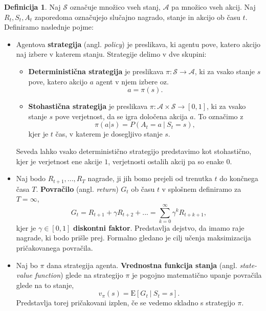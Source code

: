 \documentclass[12pt,a4paper]{amsart}
\theoremstyle{definition} %
\newtheorem{definicija}{Definicija}[section]
\theoremstyle{plain} %
\begin{document}
\begin{definicija}
    Naj $\mathcal{S}$ označuje množico vseh stanj, $\mathcal{A}$ pa množico vseh akcij. Naj $R_t,
    S_t, A_t$ zaporedoma označujejo slučajno nagrado, stanje in akcijo ob času $t$. Definiramo naslednje 
    pojme: 
    \begin{itemize}
        \item   Agentova \textbf{strategija} (angl. \textit{policy}) je preslikava, ki agentu pove, 
                katero akcijo naj izbere v katerem stanju. Strategije delimo v dve skupini:
                \begin{itemize}
                    \item \textbf{Deterministična strategija} je preslikava $\pi: \mathcal{S} 
                    \rightarrow \mathcal{A}$, ki za vsako stanje $s$ pove, katero akcijo $a$ agent v njem 
                    izbere oz.
                    $$
                    a = \pi(s).
                    $$
                    \item \textbf{Stohastična strategija} je preslikava $\pi: \mathcal{A} \times 
                    \mathcal{S} \rightarrow [0, 1]$, ki za vsako stanje $s$ pove verjetnost, da se igra 
                    določena akcija $a$. To označimo z
                    $$
                    \pi(a | s) = P(A_t = a~|~S_t = s),
                    $$
                    kjer je $t$ čas, v katerem je dosegljivo stanje $s$.
                \end{itemize}
                Seveda lahko vsako deterministično strategijo predstavimo kot stohastično, kjer je 
                verjetnost ene akcije $1$, verjetnosti ostalih akcij pa so enake $0$.
        
        \item Naj bodo $R_{t+1}, ...,R_T$ nagrade, ji jih bomo prejeli od trenutka 
                $t$ do končnega časa $T$. \textbf{Povračilo} (angl. \textit{return}) $G_t$ ob času $t$ 
                v splošnem definiramo za $T=\infty$,
                $$
                G_t = R_{t+1} + \gamma R_{t+2} + ... = \sum_{k=0}^\infty \gamma^k R_{t + k + 1} ,
                $$
                kjer je $\gamma \in [0,1]$ \textbf{diskontni faktor}. Predstavlja dejstvo, da 
                imamo raje nagrade, ki bodo prišle prej. Formalno gledano je cilj učenja 
                maksimizacija pričakovanega povračila.

         \item Naj bo $\pi$ dana strategija agenta. \textbf{Vrednostna funkcija 
                stanja} (angl. \textit{state-value function}) glede na strategijo $\pi$ je 
                pogojno matematično upanje povračila glede na to stanje, 
                \begin{equation}\label{vfs}
                v_\pi(s) = \mathrm{E} [G_t~|~S_t = s].
                \end{equation}
                Predstavlja torej pričakovani izplen, če se vedemo skladno s strategijo $\pi$.


\end{itemize}
\end{definicija}
\end{document}

